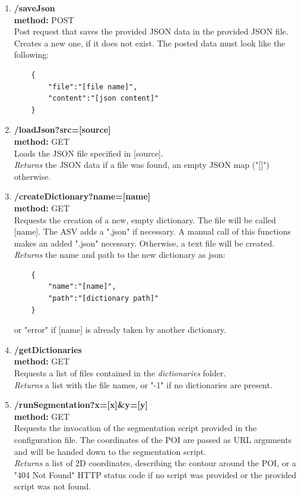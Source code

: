 \begin{enumerate}[(1) -]
	\item \textbf{/saveJson\\
	method:} POST\\
	Post request that saves the provided JSON data in the provided JSON file. Creates a new one, if it does not exist. The posted data must look like the following:
	\begin{lstlisting}
	{
		"file":"[file name]",
		"content":"[json content]"
	}
	\end{lstlisting}
		
	\item \textbf{/loadJson?src=[source]\\
	method:} GET\\
	Loads the JSON file specified in [source].\\
	\emph{Returns} the JSON data if a file was found, an empty JSON map ("[]") otherwise.
	
	\item \textbf{/createDictionary?name=[name]\\
	method:} GET\\
	Requests the creation of a new, empty dictionary. The file will be called [name]. The ASV adds a ".json" if necessary. A manual call of this functions makes an added ".json" necessary. Otherwise, a text file will be created.\\
	\emph{Returns} the name and path to the new dictionary as json:
	\begin{lstlisting}
	{
		"name":"[name]",
		"path":"[dictionary path]"
	}
	\end{lstlisting}
	or "error" if [name] is already taken by another dictionary.\clearpage
	
	\item \textbf{/getDictionaries\\
	method:} GET\\
	Requests a list of files contained in the \emph{dictionaries} folder.\\
	\emph{Returns} a list with the file names, or "-1" if no dictionaries are present.
	
	\item \textbf{/runSegmentation?x=[x]\&y=[y]\\
		method:} GET\\
	Requests the invocation of the segmentation script provided in the configuration file. The coordinates of the POI are passed as URL arguments and will be handed down to the segmentation script.\\
	\emph{Returns} a list of 2D coordinates, describing the contour around the POI, or a "404 Not Found" HTTP status code if no script was provided or the provided script was not found.
\end{enumerate}


